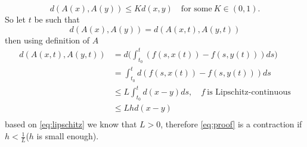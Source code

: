 \documentclass[a4paper,12pt]{article}
\begin{document}
\begin{enumerate}
	\begin{equation}\label{eq:contr}
	d(A(x), A(y)) \leq K d(x,y)\quad \text{for some}\ K \in (0,1).
	\end{equation}
	So let $t$ be such that
	\begin{equation*}
	d(A(x), A(y)) = d(A(x,t), A(y,t))
	\end{equation*}
	then using definition of $A$
	\begin{equation}\label{eq:proof}
	\begin{aligned}
		d(A(x,t), A(y,t)) &= d\bigg(\int_{t_0}^{t}(f(s,x(t)) - f(s,y(t))) ds \bigg)\\
		&= \int_{t_0}^{t} d(f(s,x(t)) - f(s,y(t))) ds\\
		&\leq L \int_{t_0}^{t} d(x-y) ds,\quad f\ \text{is Lipschitz-continuous}\\
		&\leq Lhd(x-y)\\
	\end{aligned}
	\end{equation}
	based on \eqref{eq:lipschitz} we know that $L>0$, therefore \eqref{eq:proof} is a contraction if $h<\frac{1}{L}$($h$ is small enough).
\end{enumerate}
\end{document}
